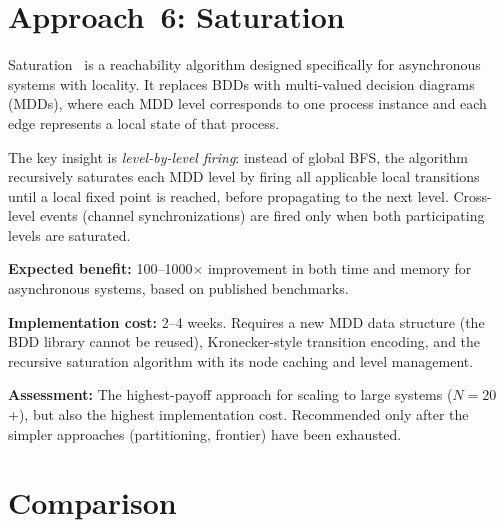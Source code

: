 \documentclass[11pt]{article}
\begin{document}
\section{Approach~6: Saturation}

Saturation~\cite{ciardo2001} is a reachability algorithm designed
specifically for asynchronous systems with locality.  It replaces
BDDs with multi-valued decision diagrams (MDDs), where each MDD
level corresponds to one process instance and each edge represents
a local state of that process.

The key insight is \emph{level-by-level firing}: instead of global
BFS, the algorithm recursively saturates each MDD level by firing
all applicable local transitions until a local fixed point is reached,
before propagating to the next level.  Cross-level events (channel
synchronizations) are fired only when both participating levels are
saturated.

\textbf{Expected benefit:}  100--1000$\times$ improvement in both
time and memory for asynchronous systems, based on published
benchmarks.

\textbf{Implementation cost:}  2--4 weeks.  Requires a new MDD
data structure (the BDD library cannot be reused), Kronecker-style
transition encoding, and the recursive saturation algorithm with
its node caching and level management.

\textbf{Assessment:}  The highest-payoff approach for scaling to
large systems ($N = 20$+), but also the highest implementation cost.
Recommended only after the simpler approaches (partitioning, frontier)
have been exhausted.

\section{Comparison}
\end{document}

